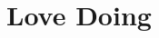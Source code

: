 \documentclass[10pt, a4paper, twocolumn]{article}
\begin{document}

%
%
%
%
%
%
%
%
%



\section*{Love Doing}
\end{document}
